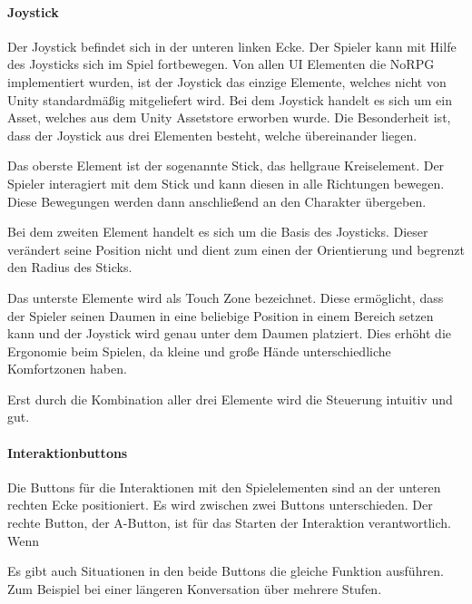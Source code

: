 			\paragraph{Joystick}
				Der Joystick befindet sich in der unteren linken Ecke. Der Spieler kann mit Hilfe des Joysticks sich im Spiel fortbewegen. Von allen UI Elementen die NoRPG implementiert wurden, ist der Joystick das einzige Elemente, welches nicht von Unity standardmäßig mitgeliefert wird. Bei dem Joystick handelt es sich um ein Asset, welches aus dem Unity Assetstore erworben wurde. Die Besonderheit ist, dass der Joystick aus drei Elementen besteht, welche übereinander liegen. 
				
				Das oberste Element ist der sogenannte Stick, das hellgraue Kreiselement. Der Spieler interagiert mit dem Stick und kann diesen in alle Richtungen bewegen. Diese Bewegungen werden dann anschließend an den Charakter übergeben. 
				
				Bei dem zweiten Element handelt es sich um die Basis des Joysticks. Dieser verändert seine Position nicht und dient zum einen der Orientierung und begrenzt den Radius des Sticks. 
				
				Das unterste Elemente wird als Touch Zone bezeichnet. Diese ermöglicht, dass der Spieler seinen Daumen in eine beliebige Position in einem Bereich setzen kann und der Joystick wird genau unter dem Daumen platziert. Dies erhöht die Ergonomie beim Spielen, da kleine und große Hände unterschiedliche Komfortzonen haben.
				
				Erst durch die Kombination aller drei Elemente wird die Steuerung intuitiv und gut.
				
			\paragraph{Interaktionbuttons}
				Die Buttons für die Interaktionen mit den Spielelementen sind an der unteren rechten Ecke positioniert. Es wird zwischen zwei Buttons unterschieden. Der rechte Button, der A-Button, ist für das Starten der Interaktion verantwortlich. Wenn
				
				Es gibt auch Situationen in den beide Buttons die gleiche Funktion ausführen. Zum Beispiel bei einer längeren Konversation über mehrere Stufen.
			
